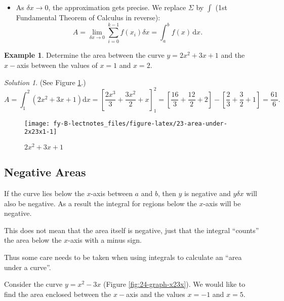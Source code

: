 \documentclass[
  english,
  11pt,
  oneside]{book}
\providecommand{\tightlist}{%
  \setlength{\itemsep}{0pt}\setlength{\parskip}{0pt}}
\newcommand{\slide}{}
\theoremstyle{definition}
\theoremstyle{definition}
\newtheorem{example}{Example}[chapter]
\theoremstyle{definition}
\theoremstyle{definition}
\theoremstyle{remark}
\newtheorem*{solution}{Solution}
\begin{document}
\begin{itemize}
\tightlist
\item
  As \(\delta x \to 0\), the approximation gets precise. We replace \(\Sigma\) by \(\int\)
  (1st Fundamental Theorem of Calculus in reverse):
  \[
  A =\lim\limits_{\delta x\to 0}\sum_{i=0}^{k-1}f(x_i) \delta x = \int_a^b f(x)\,\mathrm{d}x.
  \]
  \slide
\end{itemize}

\begin{example}
Determine the area between the curve \(y=2x^2+3x+1\) and the \(x-\)axis between the values of \(x=1\) and \(x=2\).
\end{example}

\begin{solution}
\leavevmode

(See Figure \ref{fig:23-area-under-2x23x1}.)
\[
A=\int_1^2(2x^2+3x+1)\mathrm{d}x = \left[\frac{2x^3}{3}+\frac{3x^2}{2}+x\right]_1^2 = \left[\frac{16}{3}+\frac{12}{2}+2\right]-\left[\frac{2}{3}+\frac 32 + 1\right] = \frac{61}{6}.
\]

\begin{figure}

{\centering \texttt{[image: fy-B-lectnotes\_files/figure-latex/23-area-under-2x23x1-1]} 

}

\caption{$2x^2+3x+1$}\label{fig:23-area-under-2x23x1}
\end{figure}

\end{solution}

\slide

\subsection{Negative Areas}\label{negative-areas}

If the curve lies below the \(x\)-axis between \(a\) and \(b\), then \(y\) is negative and \(y\delta x\) will also be negative. As a result the integral for regions below the \(x\)-axis will be negative.

This does not mean that the area itself is negative, just that the integral ``counts'' the area below the \(x\)-axis with a minus sign.

Thus some care needs to be taken when using integrals to calculate an ``area under a curve''.

\slide

Consider the curve \(y = x^2 - 3x\) (Figure \ref{fig:24-graph-x23x}). We would like to find the area enclosed between the \(x-\)axis and the values \(x = -1\) and \(x = 5\).
\end{document}
